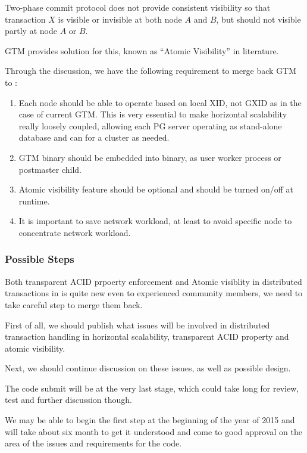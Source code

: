 	Two-phase commit protocol does not provide consistent visibility so that transaction $X$
	is visible or invisible at both node $A$ and $B$, but should not visible partly at
	node $A$ or $B$.

	GTM provides solution for this, known as ``Atomic Visibility'' in literature.

	Through the discussion, we have the following requirement to merge back GTM to \PG:

	\begin{enumerate}
		\item Each node should be able to operate based on local XID, not GXID as
			  in the case of current GTM.
			  This is very essential to make \PG{} horizontal scalability really loosely
			  coupled, allowing each PG{} server operating as stand-alone database and
			  can for a cluster as needed.
		\item GTM binary should be embedded into \PG{} binary, as user worker process or
			  postmaster child.
		\item Atomic visibility feature should be optional and should be turned on/off at
			  runtime.
		\item It is important to save network workload, at least to avoid specific node
			  to concentrate network workload.
	\end{enumerate}


\subsubsection{Possible Steps}

	Both transparent ACID prpoerty enforcement and Atomic visiblity in distributed transactions
	in \PG{} is quite new even to experienced community members, we need to take careful
	step to merge them back.

	First of all, we should publish what issues will be involved in distributed transaction
	handling in horizontal scalability, transparent ACID property and atomic visibility.

	Next, we should continue discussion on these issues, as well as possible design.

	The code submit will be at the very last stage, which could take long for review,
	test and further discussion though.

	We may be able to begin the first step at the beginning of the year of 2015 and will
	take about six month to get it understood and come to good approval on the area of
	the issues and requirements for the code.

